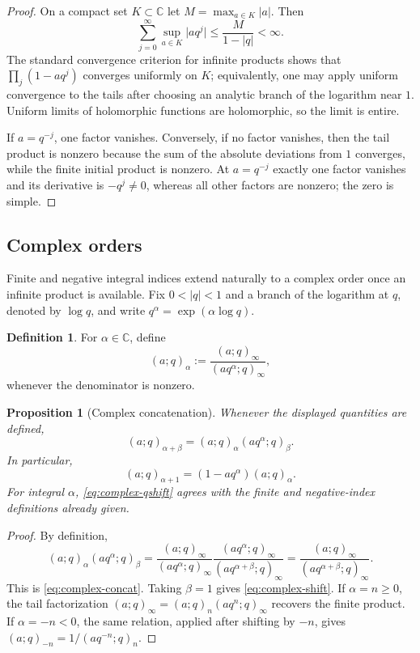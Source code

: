 \documentclass[11pt,oneside,openany]{book}
\newtheorem{proposition}[theorem]{Proposition}
\theoremstyle{definition}
\newtheorem{definition}[theorem]{Definition}
\theoremstyle{remark}
\newcommand{\C}{\mathbb C}
\newcommand{\abs}[1]{\lvert #1\rvert}
\begin{document}
\begin{proof}
On a compact set $K\subset\C$ let $M=\max_{a\in K}\abs a$.  Then
\[
 \sum_{j=0}^{\infty}\sup_{a\in K}\abs{a q^j}
 \le \frac{M}{1-\abs q}<\infty.
\]
The standard convergence criterion for infinite products shows that
\(
 \prod_j(1-aq^j)
\)
converges uniformly on $K$; equivalently, one may apply uniform convergence to the tails after choosing an analytic branch of the logarithm near $1$.  Uniform limits of holomorphic functions are holomorphic, so the limit is entire.

If $a=q^{-j}$, one factor vanishes.  Conversely, if no factor vanishes, then the tail product is nonzero because the sum of the absolute deviations from $1$ converges, while the finite initial product is nonzero.  At $a=q^{-j}$ exactly one factor vanishes and its derivative is $-q^j\ne0$, whereas all other factors are nonzero; the zero is simple.
\end{proof}

\subsection{Complex orders}

Finite and negative integral indices extend naturally to a complex order once an infinite product is available.  Fix $0<\abs q<1$ and a branch of the logarithm at $q$, denoted by $\log q$, and write $q^\alpha=\exp(\alpha\log q)$.

\begin{definition}\label{def:complex-qshift}
For $\alpha\in\C$, define
\[
 (a;q)_\alpha
 :=\frac{(a;q)_\infty}{(aq^\alpha;q)_\infty},
 \tag{1.1}\label{eq:complex-qshift}
\]
whenever the denominator is nonzero.
\end{definition}

\begin{proposition}[Complex concatenation]\label{prop:complex-concat}
Whenever the displayed quantities are defined,
\[
 (a;q)_{\alpha+\beta}
 =(a;q)_\alpha(aq^\alpha;q)_\beta.
 \tag{1.2}\label{eq:complex-concat}
\]
In particular,
\[
 (a;q)_{\alpha+1}=(1-aq^\alpha)(a;q)_\alpha.
 \tag{1.3}\label{eq:complex-shift}
\]
For integral $\alpha$, \eqref{eq:complex-qshift} agrees with the finite and negative-index definitions already given.
\end{proposition}

\begin{proof}
By definition,
\[
 (a;q)_\alpha(aq^\alpha;q)_\beta
 =\frac{(a;q)_\infty}{(aq^\alpha;q)_\infty}
  \frac{(aq^\alpha;q)_\infty}{(aq^{\alpha+\beta};q)_\infty}
 =\frac{(a;q)_\infty}{(aq^{\alpha+\beta};q)_\infty}.
\]
This is \eqref{eq:complex-concat}.  Taking $\beta=1$ gives \eqref{eq:complex-shift}.  If $\alpha=n\ge0$, the tail factorization
\(
 (a;q)_\infty=(a;q)_n(aq^n;q)_\infty
\)
recovers the finite product.  If $\alpha=-n<0$, the same relation, applied after shifting by $-n$, gives
\(
 (a;q)_{-n}=1/(aq^{-n};q)_n.
\)
\end{proof}
\end{document}
